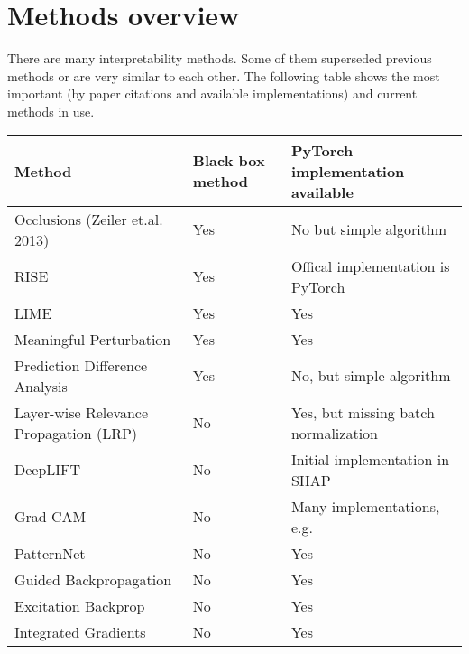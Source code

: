\section{Methods overview}
There are many interpretability methods. Some of them superseded previous methods or are very similar to each other.
The following table shows the most important (by paper citations and available implementations) and current methods in use.

\begin{tabular}{| p{6.5cm} | p{1.5cm} | p{6cm} | }
\hline
\textbf{Method} & \textbf{Black box method} & \textbf{PyTorch implementation available} \\ \hline
Occlusions (Zeiler et.al. 2013) \cite{zeiler2014visualizing} & Yes & No but simple algorithm \\ \hline
RISE \cite{Petsiuk2018rise} & Yes & Offical implementation is PyTorch \\ \hline
LIME \cite{ribeiro2016should} & Yes & Yes \\ \hline
Meaningful Perturbation \cite{fong2017interpretable} & Yes & Yes \cite{fong2017implementation} \\ \hline
Prediction Difference Analysis \cite{zintgraf2017visualizing} & Yes & No, but simple algorithm \\ \hline
Layer-wise Relevance Propagation (LRP) \cite{bach2015pixel} & No & Yes, but missing batch normalization \cite{lrppytorch} \\ \hline
DeepLIFT \cite{shrikumar2017learning} & No & Initial implementation in SHAP \cite{NIPS2017_7062} \\ \hline
Grad-CAM \cite{selvaraju2017grad} & No & Many implementations, e.g. \cite{visualattribution} \\ \hline
PatternNet \cite{kindermans2017learning} & No & Yes \cite{visualattribution} \\ \hline
Guided Backpropagation \cite{springenberg2014striving}  & No & Yes \cite{visualattribution} \\ \hline
Excitation Backprop \cite{zhang2016EB} & No & Yes \cite{visualattribution} \\ \hline
Integrated Gradients \cite{sundararajan2017axiomatic} & No & Yes \cite{integratedgradientpytorch}  \\ \hline
\end{tabular}
